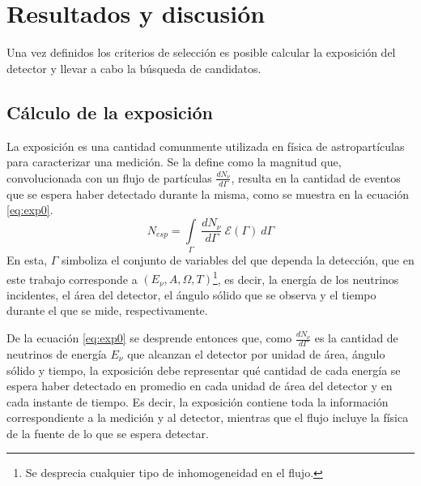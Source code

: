 \chapter{Resultados y discusi\'on}
\label{ch:resAuger}

Una vez definidos los criterios de selección es posible calcular la exposición del detector y llevar a cabo la búsqueda de candidatos.



\section{C\'alculo de la exposici\'on}
\label{sc:expoNu}
	
	La exposición es una cantidad comunmente utilizada en física de astropartículas para caracterizar una medición.
	Se la define como la magnitud que, convolucionada con un flujo de partículas $\frac{dN_{\nu}}{d\Gamma}$, resulta en la cantidad de eventos que se espera haber detectado durante la misma, como se muestra en la ecuación \ref{eq:exp0}.
	\begin{equation}
	 N_{esp}=\int\limits_{\Gamma}~\frac{dN_{\nu}}{d\Gamma}~\mathscr{E}(\Gamma) ~d\Gamma
	 \label{eq:exp0}
	\end{equation}
	En esta, $\Gamma$ simboliza el conjunto de variables del que dependa la detección, que en este trabajo corresponde a $(E_{\nu},A,\Omega,T)$\footnote{Se desprecia cualquier tipo de inhomogeneidad en el flujo.}, es decir, la energía de los neutrinos incidentes, el área del detector, el ángulo sólido que se observa y el tiempo durante el que se mide, respectivamente.
	
	De la ecuación \ref{eq:exp0} se desprende entonces que, como $\frac{dN_{\nu}}{d\Gamma}$ es la cantidad de neutrinos de energía $E_{\nu}$ que alcanzan el detector por unidad de área, ángulo sólido y tiempo, la exposición debe representar qué cantidad de cada energía se espera haber detectado en promedio en cada unidad de área del detector y en cada instante de tiempo.
	Es decir, la exposición contiene toda la información correspondiente a la medición y al detector, mientras que el flujo incluye la física de la fuente de lo que se espera detectar.
	
